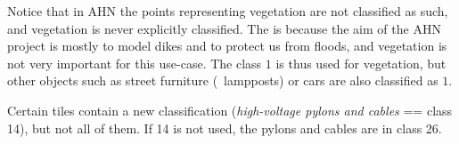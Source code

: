 Notice that in AHN the points representing vegetation are not classified as such, and vegetation is never explicitly classified.
The is because the aim of the AHN project is mostly to model dikes and to protect us from floods, and vegetation is not very important for this use-case.
The class $1$ is thus used for vegetation, but other objects such as street furniture (\eg\ lampposts) or cars are also classified as $1$.

%

Certain tiles contain a new classification (\emph{high-voltage pylons and cables} == class 14), but not all of them. 
If 14 is not used, the pylons and cables are in class 26.

%


